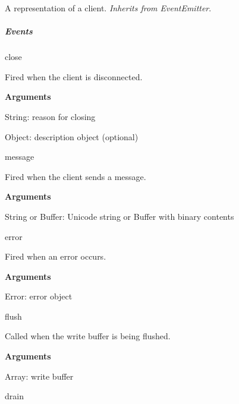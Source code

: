 A representation of a client. {\itshape Inherits from Event\+Emitter}.

\subparagraph*{Events}


\begin{DoxyItemize}
\item {\ttfamily close}
\begin{DoxyItemize}
\item Fired when the client is disconnected.
\item {\bfseries Arguments}
\begin{DoxyItemize}
\item {\ttfamily String}\+: reason for closing
\item {\ttfamily Object}\+: description object (optional)
\end{DoxyItemize}
\end{DoxyItemize}
\item {\ttfamily message}
\begin{DoxyItemize}
\item Fired when the client sends a message.
\item {\bfseries Arguments}
\begin{DoxyItemize}
\item {\ttfamily String} or {\ttfamily Buffer}\+: Unicode string or Buffer with binary contents
\end{DoxyItemize}
\end{DoxyItemize}
\item {\ttfamily error}
\begin{DoxyItemize}
\item Fired when an error occurs.
\item {\bfseries Arguments}
\begin{DoxyItemize}
\item {\ttfamily Error}\+: error object
\end{DoxyItemize}
\end{DoxyItemize}
\item {\ttfamily flush}
\begin{DoxyItemize}
\item Called when the write buffer is being flushed.
\item {\bfseries Arguments}
\begin{DoxyItemize}
\item {\ttfamily Array}\+: write buffer
\end{DoxyItemize}
\end{DoxyItemize}
\item {\ttfamily drain}
\begin{DoxyItemize}

\end{DoxyItemize}
\end{DoxyItemize}

